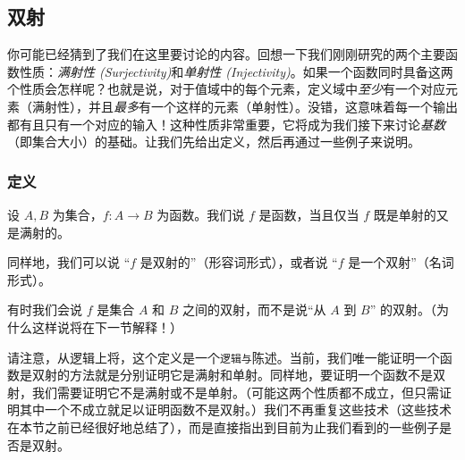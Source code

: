 
\subsection{双射}

你可能已经猜到了我们在这里要讨论的内容。回想一下我们刚刚研究的两个主要函数性质：\emph{满射性 (Surjectivity)}和\emph{单射性 (Injectivity)}。如果一个函数同时具备这两个性质会怎样呢？也就是说，对于值域中的每个元素，定义域中\emph{至少}有一个对应元素（满射性），并且\emph{最多}有一个这样的元素（单射性）。没错，这意味着每一个输出都有且只有一个对应的输入！这种性质非常重要，它将成为我们接下来讨论\emph{基数}（即集合大小）的基础。让我们先给出定义，然后再通过一些例子来说明。

\subsubsection*{定义}

\begin{definition}
    设 $A, B$ 为集合，$f: A \to B$ 为函数。我们说 $f$ 是函数，当且仅当 $f$ 既是单射的又是满射的。

    同样地，我们可以说 ``$f$ 是双射的''（形容词形式），或者说 ``$f$ 是一个双射''（名词形式）。

    有时我们会说 $f$ 是集合 $A$ 和 $B$ 之间的双射，而不是说``从 $A$ 到 $B$'' 的双射。（为什么这样说将在下一节解释！）
\end{definition}

请注意，从逻辑上将，这个定义是一个\verb|逻辑与|陈述。当前，我们唯一能证明一个函数是双射的方法就是分别证明它是满射和单射。同样地，要证明一个函数不是双射，我们需要证明它不是满射或不是单射。（可能这两个性质都不成立，但只需证明其中一个不成立就足以证明函数不是双射。）我们不再重复这些技术（这些技术在本节之前已经很好地总结了），而是直接指出到目前为止我们看到的一些例子是否是双射。\\

